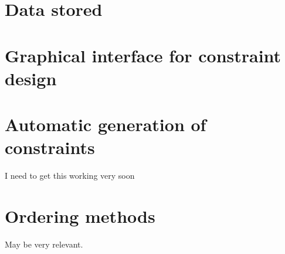 \section{Data stored}


\section{Graphical interface for constraint design}


\section{Automatic generation of constraints}
I need to get this working very soon

\section{Ordering methods}
May be very relevant.